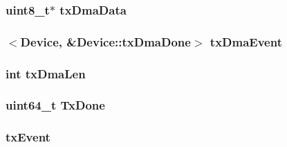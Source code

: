 \label{classSinic_1_1Device_aef3a8dd866e8017fd7a675414596ec6b}
\hypertarget{classSinic_1_1Device_af56464970a8957faf3a1d35026db6a12}{
\subsubsection[{txDmaData}]{\setlength{\rightskip}{0pt plus 5cm}uint8\_\-t$\ast$ {\bf txDmaData}}}
\label{classSinic_1_1Device_af56464970a8957faf3a1d35026db6a12}
\hypertarget{classSinic_1_1Device_a3d31afcc8e7130b3e43e5dc1a0ef0e37}{
\subsubsection[{txDmaEvent}]{$<${\bf Device}, \&Device::txDmaDone$>$ {\bf txDmaEvent}}}
\label{classSinic_1_1Device_a3d31afcc8e7130b3e43e5dc1a0ef0e37}
\hypertarget{classSinic_1_1Device_a5782be4cae30f9377ab0c645a9f65892}{
\subsubsection[{txDmaLen}]{\setlength{\rightskip}{0pt plus 5cm}int {\bf txDmaLen}}}
\label{classSinic_1_1Device_a5782be4cae30f9377ab0c645a9f65892}
\hypertarget{classSinic_1_1Device_ab0c6a1c886fdea04c1107ab914188fe7}{
\subsubsection[{TxDone}]{\setlength{\rightskip}{0pt plus 5cm}uint64\_\-t {\bf TxDone}}}
\label{classSinic_1_1Device_ab0c6a1c886fdea04c1107ab914188fe7}
\hypertarget{classSinic_1_1Device_a324fed072a29716c20a98a82927bd2a2}{
\subsubsection[{txEvent}]{ {\bf txEvent}}}
